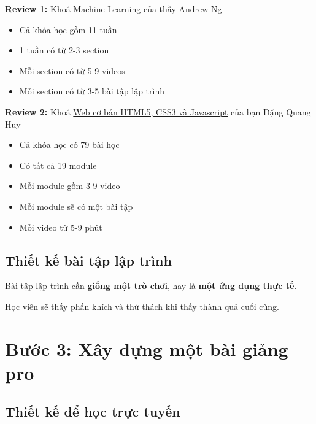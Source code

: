 \textbf{Review 1:} Khoá \href{https://www.coursera.org/learn/machine-learning/home/welcome}{Machine Learning} của thầy Andrew Ng

\begin{itemize}
  \item Cả khóa học gồm 11 tuần
  \item 1 tuần có từ 2-3 section
  \item Mỗi section có từ 5-9 videos
  \item Mỗi section có từ 3-5 bài tập lập trình
\end{itemize}

\textbf{Review 2:} Khoá \href{https://techmaster.vn/khoa-hoc/25487/web-co-ban-html5-css3-va-javascript}{Web cơ bản HTML5, CSS3 và Javascript} của bạn Đặng Quang Huy

\begin{itemize}
  \item Cả khóa học có 79 bài học
  \item Có tất cả 19 module
  \item Mỗi module gồm 3-9 video
  \item Mỗi module sẽ có một bài tập
  \item Mỗi video từ 5-9 phút
\end{itemize}

\subsection{Thiết kế bài tập lập trình}

Bài tập lập trình cần \textbf{giống một trò chơi}, hay là \textbf{một ứng dụng thực tế}.

Học viên sẽ thấy phấn khích và thử thách khi thấy thành quả cuối cùng.

\section{Bước 3: Xây dựng một bài giảng pro}


\subsection{Thiết kế để học trực tuyến}

